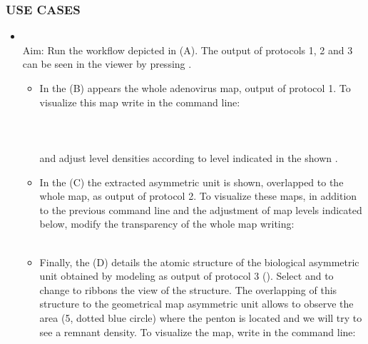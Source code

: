 \subsubsection*{USE CASES}
\begin{itemize}
                \item {}\\
                Aim: Run the \scipion workflow depicted in  (A). The output of protocols 1, 2 and 3 can be seen in the \chimera viewer by pressing .
                \begin{itemize}
                        \item In the  (B) appears the whole adenovirus map, output of protocol 1. To visualize this map write in the \chimera command line:\\
                        \\
                        \\
                        \\
                        and adjust level densities according to level indicated in the shown .
                        \item In the  (C) the extracted asymmetric unit is shown, overlapped to the whole map, as output of protocol 2. To visualize these maps, in addition to the previous \chimera command line and the adjustment of map levels indicated below, modify the transparency of the whole map writing:\\
                        \\
                        \item Finally, the  (D) details the atomic structure of the biological asymmetric unit obtained by modeling as output of protocol 3 (). Select  and  to change to ribbons the view of the structure. The overlapping of this structure to the geometrical map asymmetric unit allows to observe the area (5, dotted blue circle) where the penton is located and we will try to see a remnant density. To visualize the map, write in the command line:\\
                        \\
                \end{itemize}


\end{itemize}
